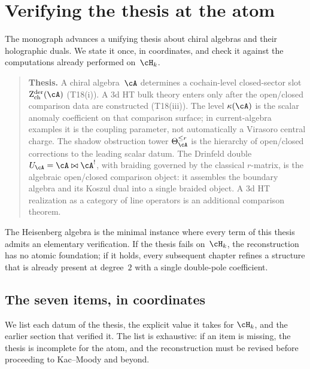 \section{Verifying the thesis at the atom}
\label{sec:frame-thesis-at-atom}

The monograph advances a unifying thesis about chiral algebras and
their holographic duals. We state it once, in coordinates, and check
it against the computations already performed on~$\cH_k$.

\begin{quote}
\textbf{Thesis.} A chiral algebra~$\cA$ determines a cochain-level
closed-sector slot
$\mathrm{Z}^{\mathrm{der}}_{\mathrm{ch}}(\cA)$ (T18(i)). A $3$d HT
bulk theory enters only after the open/closed comparison data are
constructed (T18(iii)). The level $\kappa(\cA)$ is the scalar anomaly
coefficient on that comparison surface; in current-algebra examples it
is the coupling parameter, not automatically a Virasoro central charge.
The shadow obstruction tower
$\Theta_{\cA}^{\leq r}$ is the hierarchy of open/closed corrections
to the leading scalar datum. The Drinfeld double
$U_{\cA} = \cA \bowtie \cA^!$, with braiding governed by the
classical $r$-matrix, is the algebraic open/closed comparison object:
it assembles the boundary algebra and its Koszul dual into a single
braided object. A $3$d HT realization as a category of line operators
is an additional comparison theorem.
\end{quote}

The Heisenberg algebra is the minimal instance where every term of
this thesis admits an elementary verification. If the thesis fails
on~$\cH_k$, the reconstruction has no atomic foundation; if it holds, every
subsequent chapter refines a structure that is already present at
degree~$2$ with a single double-pole coefficient.

\subsection{The seven items, in coordinates}
\label{subsec:frame-thesis-seven}

We list each datum of the thesis, the explicit value it takes for
$\cH_k$, and the earlier section that verified it. The list is
exhaustive: if an item is missing, the thesis is incomplete for the
atom, and the reconstruction must be revised before proceeding to
Kac--Moody and beyond.

